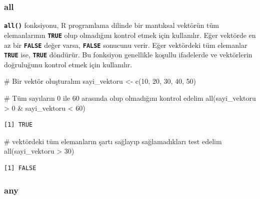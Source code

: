 \documentclass[
  letterpaper,
  DIV=11,
  numbers=noendperiod]{scrreprt}
\newenvironment{Shaded}{\begin{snugshade}}{\end{snugshade}}
\newcommand{\CommentTok}[1]{\textcolor[rgb]{0.37,0.37,0.37}{#1}}
\newcommand{\DecValTok}[1]{\textcolor[rgb]{0.68,0.00,0.00}{#1}}
\newcommand{\FunctionTok}[1]{\textcolor[rgb]{0.28,0.35,0.67}{#1}}
\newcommand{\NormalTok}[1]{\textcolor[rgb]{0.00,0.23,0.31}{#1}}
\newcommand{\OtherTok}[1]{\textcolor[rgb]{0.00,0.23,0.31}{#1}}
\newcommand{\SpecialCharTok}[1]{\textcolor[rgb]{0.37,0.37,0.37}{#1}}
\begin{document}
\subsubsection{\texorpdfstring{\textbf{all}}{all}}\label{all}

\textbf{\texttt{all()}} fonksiyonu, R programlama dilinde bir mantıksal
vektörün tüm elemanlarının \textbf{\texttt{TRUE}} olup olmadığını
kontrol etmek için kullanılır. Eğer vektörde en az bir
\textbf{\texttt{FALSE}} değer varsa, \textbf{\texttt{FALSE}} sonucunu
verir. Eğer vektördeki tüm elemanlar \textbf{\texttt{TRUE}} ise,
\textbf{\texttt{TRUE}} döndürür. Bu fonksiyon genellikle koşullu
ifadelerde ve vektörlerin doğruluğunu kontrol etmek için kullanılır.

\begin{Shaded}
\begin{Highlighting}[]
\CommentTok{\# Bir vektör oluşturalım}
\NormalTok{sayi\_vektoru }\OtherTok{\textless{}{-}} \FunctionTok{c}\NormalTok{(}\DecValTok{10}\NormalTok{, }\DecValTok{20}\NormalTok{, }\DecValTok{30}\NormalTok{, }\DecValTok{40}\NormalTok{, }\DecValTok{50}\NormalTok{)}

\CommentTok{\# Tüm sayıların 0 ile 60 arasında olup olmadığını kontrol edelim}
\FunctionTok{all}\NormalTok{(sayi\_vektoru }\SpecialCharTok{\textgreater{}} \DecValTok{0} \SpecialCharTok{\&}\NormalTok{ sayi\_vektoru }\SpecialCharTok{\textless{}} \DecValTok{60}\NormalTok{)}
\end{Highlighting}
\end{Shaded}

\begin{verbatim}
[1] TRUE
\end{verbatim}

\begin{Shaded}
\begin{Highlighting}[]
\CommentTok{\# vektördeki tüm elemanların şartı sağlayıp sağlamadıkları test edelim}
\FunctionTok{all}\NormalTok{(sayi\_vektoru }\SpecialCharTok{\textgreater{}} \DecValTok{30}\NormalTok{) }
\end{Highlighting}
\end{Shaded}

\begin{verbatim}
[1] FALSE
\end{verbatim}

\subsubsection{\texorpdfstring{\textbf{any}}{any}}\label{any}
\end{document}
